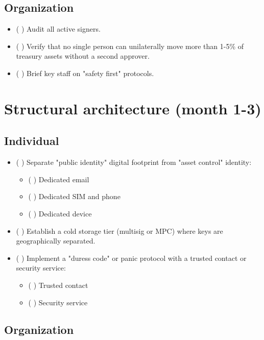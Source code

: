 \subsection{Organization}\label{organization}

\begin{itemize}
\tightlist
\item
  ( ) Audit all active signers.
\item
  ( ) Verify that no single person can unilaterally move more than 1-5\% of treasury assets without a second approver.
\item
  ( ) Brief key staff on "safety first" protocols.
\end{itemize}

\section{Structural architecture (month 1-3)}\label{structural-architecture-month-1-3}

\subsection{Individual}\label{individual-1}

\begin{itemize}
\tightlist
\item
  ( ) Separate "public identity" digital footprint from "asset control" identity:

  \begin{itemize}
  \tightlist
  \item
    ( ) Dedicated email
  \item
    ( ) Dedicated SIM and phone
  \item
    ( ) Dedicated device
  \end{itemize}
\item
  ( ) Establish a cold storage tier (multisig or MPC) where keys are geographically separated.
\item
  ( ) Implement a "duress code" or panic protocol with a trusted contact or security service:

  \begin{itemize}
  \tightlist
  \item
    ( ) Trusted contact
  \item
    ( ) Security service
  \end{itemize}
\end{itemize}

\subsection{Organization}\label{organization-1}

